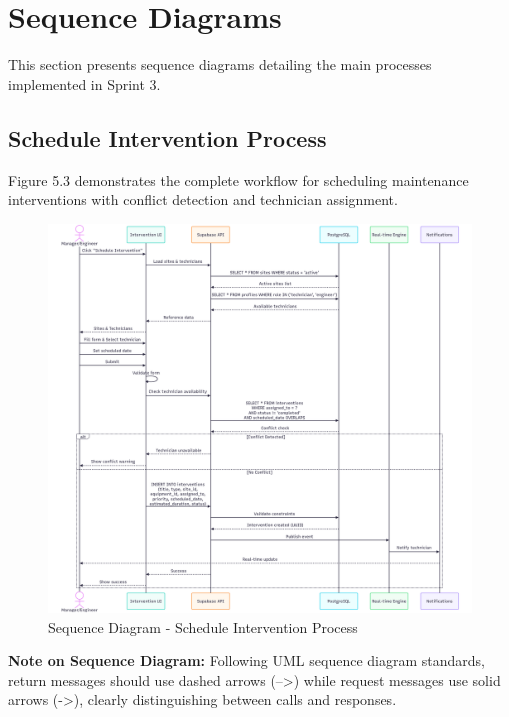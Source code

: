 \section{Sequence Diagrams}

This section presents sequence diagrams detailing the main processes implemented in Sprint 3.

\subsection{Schedule Intervention Process}

Figure 5.3 demonstrates the complete workflow for scheduling maintenance interventions with conflict detection and technician assignment.

\begin{figure}[H]
    \centering
    \includegraphics[width=0.95\linewidth]{img/chap_05/sprint3_sequence_intervention.png}
    \caption{Sequence Diagram - Schedule Intervention Process}
    \label{fig:sequence_schedule_intervention}
\end{figure}

\textbf{Note on Sequence Diagram:} Following UML sequence diagram standards, return messages should use dashed arrows (-->) while request messages use solid arrows (->), clearly distinguishing between calls and responses.

